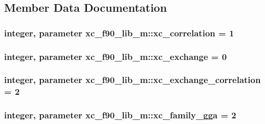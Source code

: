 \subsection{Member Data Documentation}
\hypertarget{classxc__f90__lib__m_acdf651e6c31fec0f068ec07404200789}{
\subsubsection[{xc\-\_\-correlation}]{\setlength{\rightskip}{0pt plus 5cm}integer, parameter xc\-\_\-f90\-\_\-lib\-\_\-m\-::xc\-\_\-correlation = 1}}\label{classxc__f90__lib__m_acdf651e6c31fec0f068ec07404200789}
\hypertarget{classxc__f90__lib__m_a551dd13874717476b945c28b0404bcd9}{
\subsubsection[{xc\-\_\-exchange}]{\setlength{\rightskip}{0pt plus 5cm}integer, parameter xc\-\_\-f90\-\_\-lib\-\_\-m\-::xc\-\_\-exchange = 0}}\label{classxc__f90__lib__m_a551dd13874717476b945c28b0404bcd9}
\hypertarget{classxc__f90__lib__m_a163202bbf67d5c8c3f0179f2703312bb}{
\subsubsection[{xc\-\_\-exchange\-\_\-correlation}]{\setlength{\rightskip}{0pt plus 5cm}integer, parameter xc\-\_\-f90\-\_\-lib\-\_\-m\-::xc\-\_\-exchange\-\_\-correlation = 2}}\label{classxc__f90__lib__m_a163202bbf67d5c8c3f0179f2703312bb}
\hypertarget{classxc__f90__lib__m_af607b9deb44b29c87f5b08e82a8eb484}{
\subsubsection[{xc\-\_\-family\-\_\-gga}]{\setlength{\rightskip}{0pt plus 5cm}integer, parameter xc\-\_\-f90\-\_\-lib\-\_\-m\-::xc\-\_\-family\-\_\-gga = 2}}\label{classxc__f90__lib__m_af607b9deb44b29c87f5b08e82a8eb484}
